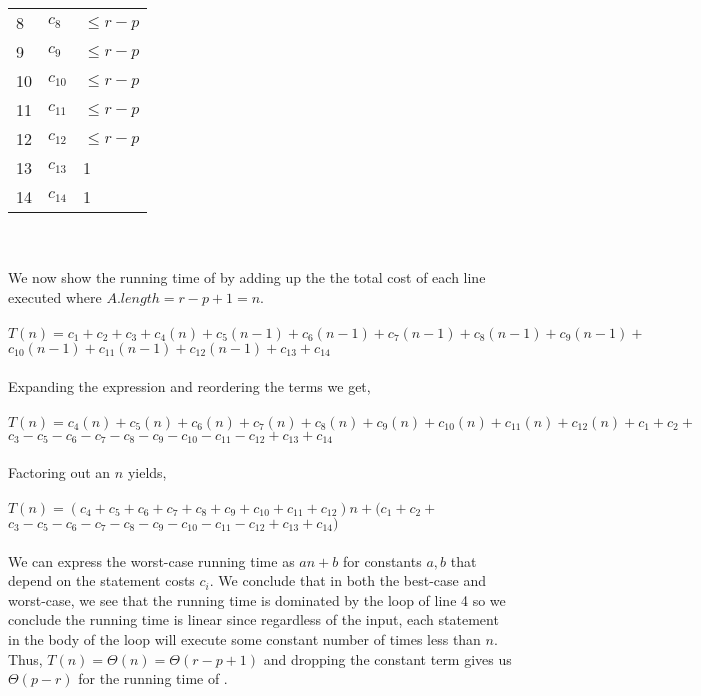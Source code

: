 \documentclass[11pt]{article}
\theoremstyle{nonumberplain}
\begin{document}
\begin{enumerate}
\begin{tabular}{ @{\hskip0pt}l l l }
  8 & $c_8$ & $\le r-p$ \\
  9 & $c_9$ & $\le r-p$ \\
  10 & $c_{10}$ & $\le r-p$ \\
  11 & $c_{11}$ & $\le r-p$ \\
  12 & $c_{12}$ & $\le r-p$ \\
  13 & $c_{13}$ & 1 \\
  14 & $c_{14}$ & 1
  \end{tabular}\\
  \\
  We now show the running time of  by adding up the the total cost of each line executed where $A.length=r-p+1=n$. \\
  \\
  $T(n)=c_1+c_2+c_3+c_4(n)+c_5(n-1)+c_6(n-1)+c_7(n-1)+c_8(n-1)+c_9(n-1)+$\\ \phantom{T(n) =} $c_{10}(n-1)+c_{11}(n-1)+c_{12}(n-1)+c_{13}+c_{14}$ \\
  \\
  Expanding the expression and reordering the terms we get, \\
  \\
  $T(n)=c_4(n)+c_5(n)+c_6(n)+c_7(n)+c_8(n)+c_9(n)+c_{10}(n)+c_{11}(n)+c_{12}(n)+c_1+c_2+$ \\ \phantom{T(n) =} $c_3-c_5-c_6-c_7-c_8-c_9-c_{10}-c_{11}-c_{12}+c_{13}+c_{14}$\\
  \\
  Factoring out an $n$ yields, \\
  \\
  $T(n)=(c_4+c_5+c_6+c_7+c_8+c_9+c_{10}+c_{11}+c_{12})n+(c_1+c_2+$ \\ \phantom{T(n) =} $c_3-c_5-c_6-c_7-c_8-c_9-c_{10}-c_{11}-c_{12}+c_{13}+c_{14})$ \\
  \\
  We can express the worst-case running time as $an+b$ for constants $a,b$ that depend on the statement costs $c_i$. We conclude that in both the best-case and worst-case, we see that the running time is dominated by the \For loop of line 4 so we conclude the running time is linear since regardless of the input, each statement in the body of the loop will execute some constant number of times less than $n$. Thus, $T(n)=\Theta(n)=\Theta(r-p+1)$ and dropping the constant term gives us $\Theta(p-r)$ for the running time of .

\end{enumerate}
\end{document}
